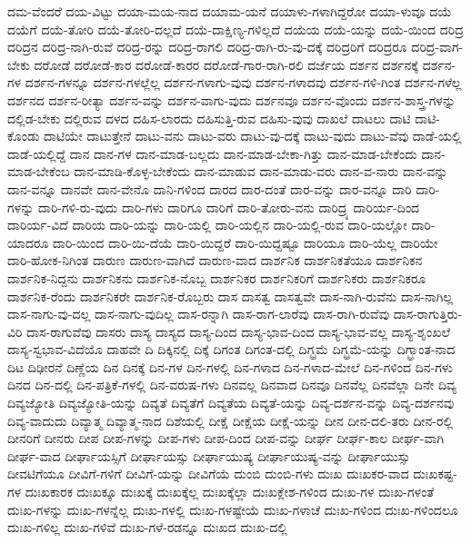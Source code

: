 {ದಮ-ವೆಂದರೆ
ದಯ-ವಿಟ್ಟು
ದಯಾ-ಮಯ-ನಾದ
ದಯಾಮ-ಯನೆ
ದಯಾಳು-ಗಳಾಗಿದ್ದರೋ
ದಯಾ-ಳುವೂ
ದಯೆ
ದಯೆಗೆ
ದಯೆ-ತೋರಿ
ದಯೆ-ತೋರಿ-ದಲ್ಲದೆ
ದಯೆ-ದಾಕ್ಷಿಣ್ಯ-ಗಳಿಲ್ಲದೆ
ದಯೆಯ
ದಯೆ-ಯನ್ನು
ದಯೆ-ಯಿಂದ
ದರಿದ್ರ
ದರಿದ್ರನ
ದರಿದ್ರ-ನಾಗಿ-ರುವೆ
ದರಿದ್ರ-ರನ್ನು
ದರಿದ್ರ-ರಾಗಲಿ
ದರಿದ್ರ-ರಾಗಿ-ರು-ವು-ದಕ್ಕೆ
ದರಿದ್ರರಿಗೆ
ದರಿದ್ರರೂ
ದರಿದ್ರ-ವಾಗ-ಬೇಕು
ದರೋಡೆ
ದರೋಡೆ-ಕಾರ
ದರೋಡೆ-ಕಾರರ
ದರೋಡೆ-ಗಾರ-ರಾಗಿ-ರಲಿ
ದರ್ಜೆಯ
ದರ್ಶನ
ದರ್ಶನಕ್ಕೆ
ದರ್ಶನ-ಗಳ
ದರ್ಶನ-ಗಳನ್ನೂ
ದರ್ಶನ-ಗಳಲ್ಲೆಲ್ಲ
ದರ್ಶನ-ಗಳಾಗು-ವುವು
ದರ್ಶನ-ಗಳಾದವು
ದರ್ಶನ-ಗಳಿ-ಗಿಂತ
ದರ್ಶನ-ಗಳೆಲ್ಲ
ದರ್ಶನದ
ದರ್ಶನ-ರೀತ್ಯಾ
ದರ್ಶನ-ವನ್ನು
ದರ್ಶನ-ವಾಗು-ವುದು
ದರ್ಶನವೂ
ದರ್ಶನ-ವೊಂದು
ದರ್ಶನ-ಶಾಸ್ತ್ರ-ಗಳನ್ನು
ದಲ್ಲಿಡ-ಬೇಕು
ದಲ್ಲಿರುವ
ದಳದ
ದಹಿಸ-ಲಾರದು
ದಹಿಸುತ್ತಿ-ರುವ
ದಹಿಸು-ವುವು
ದಾಖಲೆ
ದಾಟಲು
ದಾಟಿ
ದಾಟಿ-ಕೊಂಡು
ದಾಟಿಯೇ
ದಾಟುತ್ತೇನೆ
ದಾಟು-ವನು
ದಾಟು-ವರು
ದಾಟು-ವು-ದಕ್ಕೆ
ದಾಟು-ವುದು
ದಾಟು-ವೆವು
ದಾಡೆ-ಯಲ್ಲಿ
ದಾಡೆ-ಯಲ್ಲಿದ್ದೆ
ದಾನ
ದಾನ-ಗಳ
ದಾನ-ಮಾಡ-ಬಲ್ಲದು
ದಾನ-ಮಾಡ-ಬೇಕಾ-ಗಿತ್ತು
ದಾನ-ಮಾಡ-ಬೇಕೆಂದು
ದಾನ-ಮಾಡ-ಬೇಕೆಂಬ
ದಾನ-ಮಾಡಿ-ಕೊಳ್ಳ-ಬೇಕೆಂದು
ದಾನ-ಮಾಡುವ
ದಾನ-ಮಾಡು-ವರು
ದಾನ-ವ-ನಾರು
ದಾನ-ವನ್ನು
ದಾನ-ವನ್ನೂ
ದಾನವೇ
ದಾನ-ವೇನೊ
ದಾನಿ-ಗಳಿಂದ
ದಾರದ
ದಾರ-ದಂತೆ
ದಾರ-ವನ್ನು
ದಾರ-ವನ್ನೂ
ದಾರಿ
ದಾರಿ-ಗಳನ್ನು
ದಾರಿ-ಗಳಿ-ರು-ವುದು
ದಾರಿ-ಗಳು
ದಾರಿಗೂ
ದಾರಿಗೆ
ದಾರಿ-ತೋರು-ವನು
ದಾರಿದ್ರ್ಯ
ದಾರಿರ್ಯ-ದಿಂದ
ದಾರಿರ್ಯ-ವಿದೆ
ದಾರಿಯ
ದಾರಿ-ಯನ್ನು
ದಾರಿ-ಯಲ್ಲಿ
ದಾರಿ-ಯಲ್ಲಿನ
ದಾರಿ-ಯಲ್ಲಿ-ರುವ
ದಾರಿ-ಯಲ್ಲೋ
ದಾರಿ-ಯಾದರೂ
ದಾರಿ-ಯಿಂದ
ದಾರಿ-ಯಿ-ದೆಯೆ
ದಾರಿ-ಯಿದ್ದರೆ
ದಾರಿ-ಯಿದ್ದಷ್ಟೂ
ದಾರಿಯೂ
ದಾರಿ-ಯೆಲ್ಲ
ದಾರಿಯೇ
ದಾರಿ-ಹೋಕ-ನಿಗಿಂತ
ದಾರುಣ
ದಾರುಣ-ವಾಗಿದೆ
ದಾರುಣ-ವಾದ
ದಾರ್ಶನಿಕ
ದಾರ್ಶನಿಕತೆಯೂ
ದಾರ್ಶನಿಕನ
ದಾರ್ಶನಿಕ-ನಿದ್ದನು
ದಾರ್ಶನಿಕನು
ದಾರ್ಶನಿಕ-ನೊಬ್ಬ
ದಾರ್ಶನಿಕರ
ದಾರ್ಶನಿಕರಿಗೆ
ದಾರ್ಶನಿಕರು
ದಾರ್ಶನಿಕರೂ
ದಾರ್ಶನಿಕ-ರೆಂದು
ದಾರ್ಶನಿಕರೇ
ದಾರ್ಶನಿಕ-ರೊಬ್ಬರು
ದಾಸ
ದಾಸತ್ವ
ದಾಸತ್ವವೇ
ದಾಸ-ನಾಗಿ-ರುವೆನು
ದಾಸ-ನಾಗಿಲ್ಲ
ದಾಸ-ನಾಗು-ವು-ದಲ್ಲ
ದಾಸ-ನಾಗು-ವುದಿಲ್ಲ
ದಾಸ-ರನ್ನಾಗಿ
ದಾಸ-ರಾಗ-ಲಾರೆವು
ದಾಸ-ರಾಗಿ-ರುವೆವು
ದಾಸ-ರಾಗುತ್ತಿರು-ವಿರಿ
ದಾಸ-ರಾಗುವೆವು
ದಾಸರು
ದಾಸ್ಯ
ದಾಸ್ಯದ
ದಾಸ್ಯ-ದಿಂದ
ದಾಸ್ಯ-ಭಾವ-ದಿಂದ
ದಾಸ್ಯ-ಭಾವ-ವಲ್ಲ
ದಾಸ್ಯ-ಶೃಂಖಲೆ
ದಾಸ್ಯ-ಸ್ವಭಾವ-ವಿದೆಯೊ
ದಾಹವೇ
ದಿ
ದಿಕ್ಕಿನಲ್ಲಿ
ದಿಕ್ಕೆ
ದಿಗಂತ
ದಿಗಂತ-ದಲ್ಲಿ
ದಿಗ್ಭ್ರಮೆ
ದಿಗ್ಭ್ರಮೆ-ಯನ್ನು
ದಿಗ್ಭ್ರಾಂತ-ನಾದ
ದಿಟ
ದಿಢೀರನೆ
ದಿಣ್ಣೆಯ
ದಿನ
ದಿನಕ್ಕೆ
ದಿನ-ಗಳ
ದಿನ-ಗಳಲ್ಲಿ
ದಿನ-ಗಳಾದ
ದಿನ-ಗಳಾದ-ಮೇಲೆ
ದಿನ-ಗಳಿಂದ
ದಿನ-ಗಳು
ದಿನದ
ದಿನ-ದಲ್ಲಿ
ದಿನ-ಪತ್ರಿಕೆ-ಗಳಲ್ಲಿ
ದಿನ-ವರುಷ-ಗಳು
ದಿನವಲ್ಲ
ದಿನವಾದ
ದಿನವೂ
ದಿನವೆಲ್ಲ
ದಿನವೆಲ್ಲಾ
ದಿನೇ
ದಿವ್ಯ
ದಿವ್ಯಜ್ಯೋತಿ
ದಿವ್ಯಜ್ಯೋತಿ-ಯನ್ನು
ದಿವ್ಯತೆ
ದಿವ್ಯತೆಗೆ
ದಿವ್ಯತೆಯ
ದಿವ್ಯತೆ-ಯನ್ನು
ದಿವ್ಯ-ದರ್ಶನ-ವನ್ನು
ದಿವ್ಯ-ದರ್ಶನವು
ದಿವ್ಯ-ವಾದುದು
ದಿವ್ಯಾತ್ಮ
ದಿವ್ಯಾತ್ಮ-ನಾದ
ದಿಶೆಯಲ್ಲಿ
ದೀಕ್ಷೆ
ದೀಕ್ಷೆಯ
ದೀಕ್ಷೆ-ಯನ್ನು
ದೀನ
ದೀನ-ದಲಿ-ತರು
ದೀನ-ರಲ್ಲಿ
ದೀನರಿಗೆ
ದೀನರು
ದೀಪ
ದೀಪ-ಗಳನ್ನು
ದೀಪ-ಗಳು
ದೀಪ-ದಿಂದ
ದೀಪ-ವನ್ನು
ದೀರ್ಘ
ದೀರ್ಘ-ಕಾಲ
ದೀರ್ಘ-ವಾಗಿ
ದೀರ್ಘ-ವಾದ
ದೀರ್ಘಾಯಸ್ಸಿಗೆ
ದೀರ್ಘಾಯಸ್ಸು
ದೀರ್ಘಾಯುಷ್ಯ
ದೀರ್ಘಾಯುಷ್ಯ-ವನ್ನು
ದೀರ್ಘಾಯುಸ್ಸು
ದೀವಟಿಗೆಯೂ
ದೀವಿಗೆ-ಗಳಿಗೆ
ದೀವಿಗೆ-ಯನ್ನು
ದೀವಿಗೆಯೆ
ದುಂಬಿ
ದುಂಬಿ-ಗಳು
ದುಃಖ
ದುಃಖಕರ-ವಾದ
ದುಃಖಕಷ್ಟ-ಗಳ
ದುಃಖಕಾರಕ
ದುಃಖಕ್ಕೂ
ದುಃಖಕ್ಕೆ
ದುಃಖಕ್ಕೆಲ್ಲ
ದುಃಖಕ್ಕೆಲ್ಲಾ
ದುಃಖಕ್ಲೇಶ-ಗಳಿಂದ
ದುಃಖ-ಗಳ
ದುಃಖ-ಗಳಂತೆ
ದುಃಖ-ಗಳನ್ನು
ದುಃಖ-ಗಳನ್ನೆಲ್ಲ
ದುಃಖ-ಗಳಲ್ಲಿ
ದುಃಖ-ಗಳಷ್ಟೇಯೆ
ದುಃಖ-ಗಳಾಚೆ
ದುಃಖ-ಗಳಿಂದ
ದುಃಖ-ಗಳಿಂದಲೂ
ದುಃಖ-ಗಳಿಲ್ಲ
ದುಃಖ-ಗಳಿವೆ
ದುಃಖ-ಗಳೆ-ರಡನ್ನೂ
ದುಃಖದ
ದುಃಖ-ದಲ್ಲಿ
}
